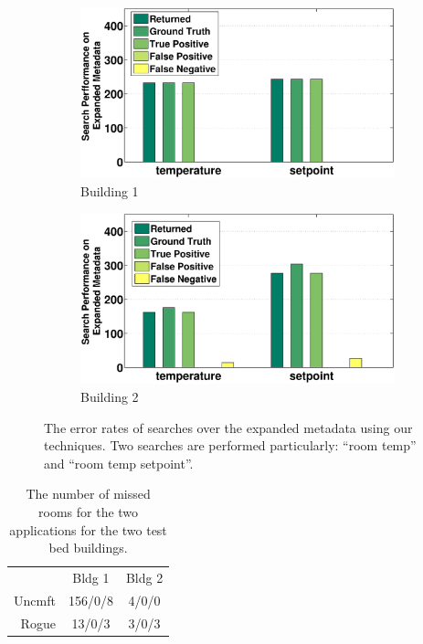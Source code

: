 \begin{figure}[h!]
\centering
	\begin{subfigure}{0.48\textwidth}
                \centering
		\includegraphics[width=\textwidth]{./figs/50-soda.eps}
                \caption{Building 1}
	\end{subfigure}
	\begin{subfigure}{0.48\textwidth}
                \centering
		\includegraphics[width=\textwidth]{./figs/50-sdh.eps}
                \caption{Building 2}
	\end{subfigure}
\caption{The error rates of searches over the expanded metadata using our techniques. Two searches are performed particularly: ``room temp'' and ``room temp setpoint''.}
\label{fig:error}
\end{figure}

\begin{table}[ht!]
 \begin{center}
\begin{tabular}{rcc}
\multicolumn{1}{l}{} & Bldg 1                 & Bldg 2                  \\ \cline{2-3} 
Uncmft               & \multicolumn{1}{|c}{156/0/8} & \multicolumn{1}{|c|}{4/0/0} \\ \cline{2-3} 
Rogue                & \multicolumn{1}{|c}{13/0/3} & \multicolumn{1}{|c|}{3/0/3} \\ \cline{2-3} 
\end{tabular}
 \end{center}
 \caption{The number of missed rooms for the two applications for the two test bed buildings.}
 \label{tab:cluster}
\end{table}